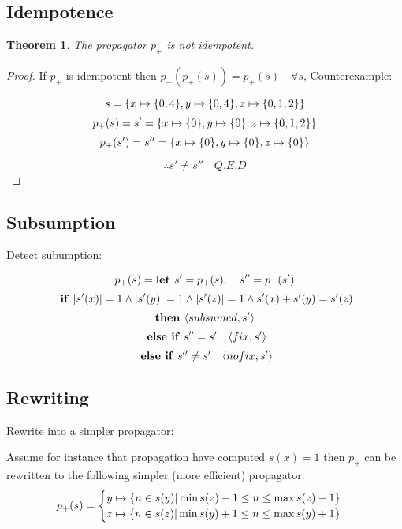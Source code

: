 \documentclass[a4paper, 11pt]{article}
\newtheorem{theorem}{Theorem}[section]
\newcommand\mymapsto{\mathrel{\ooalign{$\rightarrow$\cr%
  \kern-.15ex\raise.275ex\hbox{\scalebox{1}[0.522]{$\mid$}}\cr}}}
\begin{document}
\subsection*{Idempotence}
\begin{theorem}
The propagator $p_+$ is not idempotent.
\end{theorem}
\begin{proof}
If $p_+$ is idempotent then $p_+(p_+(s)) = p_+(s) \quad \forall s$, 
Counterexample:

$$s = \{x \mymapsto \{0,4\}, y \mymapsto \{0,4\}, z \mymapsto \{0,1,2\}\}$$
$$p_+(s) = s' = \{x \mymapsto \{0\}, y \mymapsto \{0\}, z \mymapsto \{0,1,2\}\}$$
$$p_+(s') = s'' = \{x \mymapsto \{0\}, y \mymapsto \{0\}, z \mymapsto \{0\}\}$$

$$\therefore s' \neq s'' \quad Q.E.D$$

\end{proof}
\subsection*{Subsumption}
Detect subumption:

$$p_+(s) = \text{\textbf{let }} s' = p_+(s),\quad s'' = p_+(s')$$
$$\text{ \textbf{if }} |s'(x)| = 1 \land |s'(y)| = 1 \land |s'(z)| = 1 \land s'(x) + s'(y) = s'(z)$$
$$\text{\textbf{then }} \langle subsumed, s'\rangle$$
$$\text{ \textbf{else if} } s'' = s' \quad \langle fix, s' \rangle$$
$$\text{ \textbf{else if} } s'' \neq s' \quad \langle nofix, s' \rangle$$

\subsection*{Rewriting}
Rewrite into a simpler propagator:

Assume for instance that propagation have computed $s(x) = {1}$ then $p_+$ can be rewritten to the following simpler (more efficient) propagator:
\begin{gather*}
p_+(s) = 
\begin{cases}
  y \mymapsto \{n \in s(y) | \min s(z) - 1 \leq n \leq \max s(z) - 1 \}\\
  z \mymapsto \{n \in s(z) | \min s(y) + 1 \leq n \leq \max s(y) + 1 \}\\    
\end{cases}
\end{gather*}
{}

\end{document}
